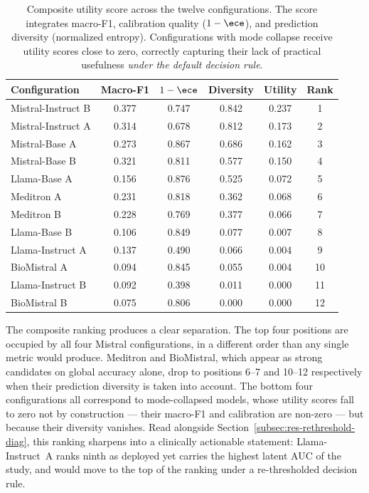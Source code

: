 \begin{table}[htbp]
    \centering
    \caption{Composite utility score across the twelve configurations. 
        The score integrates macro-F1, calibration quality ($1 - \ece$), 
        and prediction diversity (normalized entropy). Configurations 
        with mode collapse receive utility scores close to zero, 
        correctly capturing their lack of practical usefulness 
        \emph{under the default decision rule}.}
    \label{tab:res-composite}
    \small
    \begin{tabular}{@{}lccccc@{}}
        \toprule
        \textbf{Configuration} & 
        \textbf{Macro-F1} & 
        \boldmath$1-\ece$ & 
        \textbf{Diversity} & 
        \textbf{Utility} & 
        \textbf{Rank} \\
        \midrule
        Mistral-Instruct B & 0.377 & 0.747 & 0.842 & 0.237 & 1 \\
        Mistral-Instruct A & 0.314 & 0.678 & 0.812 & 0.173 & 2 \\
        Mistral-Base A     & 0.273 & 0.867 & 0.686 & 0.162 & 3 \\
        Mistral-Base B     & 0.321 & 0.811 & 0.577 & 0.150 & 4 \\
        Llama-Base A       & 0.156 & 0.876 & 0.525 & 0.072 & 5 \\
        Meditron A         & 0.231 & 0.818 & 0.362 & 0.068 & 6 \\
        Meditron B         & 0.228 & 0.769 & 0.377 & 0.066 & 7 \\
        Llama-Base B       & 0.106 & 0.849 & 0.077 & 0.007 & 8 \\
        Llama-Instruct A   & 0.137 & 0.490 & 0.066 & 0.004 & 9 \\
        BioMistral A       & 0.094 & 0.845 & 0.055 & 0.004 & 10 \\
        Llama-Instruct B   & 0.092 & 0.398 & 0.011 & 0.000 & 11 \\
        BioMistral B       & 0.075 & 0.806 & 0.000 & 0.000 & 12 \\
        \bottomrule
    \end{tabular}
\end{table}

The composite ranking produces a clear separation. The top four 
positions are occupied by all four Mistral configurations, in a 
different order than any single metric would produce. Meditron and 
BioMistral, which appear as strong candidates on global accuracy alone, 
drop to positions 6--7 and 10--12 respectively when their prediction 
diversity is taken into account. The bottom four configurations all 
correspond to mode-collapsed models, whose utility scores fall to 
zero not by construction --- their macro-F1 and calibration are 
non-zero --- but because their diversity vanishes. Read alongside 
Section~\ref{subsec:res-rethreshold-diag}, this ranking sharpens into a 
clinically actionable statement: Llama-Instruct~A ranks ninth as deployed 
yet carries the highest latent AUC of the study, and would move to the 
top of the ranking under a re-thresholded decision rule.

